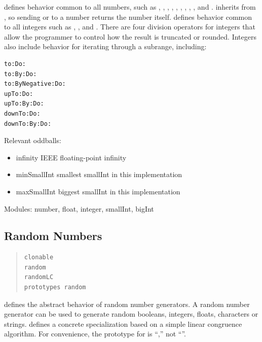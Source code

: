 \documentclass[letterpaper,10pt,english]{sphinxmanual}
\begin{document}
 defines behavior common to all numbers, such as , , ,
, , , , , , and . 
inherits from , so sending  or  to a number returns the
number itself.  defines behavior common to all integers such as , , and
. There are four division operators for integers that allow the programmer to control
how the result is truncated or rounded. Integers also include behavior for iterating through a subrange,
including:

\begin{Verbatim}[commandchars=\\\{\}]
to:Do:
to:By:Do:
to:ByNegative:Do:
upTo:Do:
upTo:By:Do:
downTo:Do:
downTo:By:Do:
\end{Verbatim}

Relevant oddballs:
\begin{itemize}
\item {} 
infinity IEEE floating-point infinity

\item {} 
minSmallInt smallest smallInt in this implementation

\item {} 
maxSmallInt biggest smallInt in this implementation

\end{itemize}

Modules: number, float, integer, smallInt, bigInt


\subsection{Random Numbers}
\label{numbers:random-numbers}\begin{quote}

\begin{Verbatim}[commandchars=\\\{\}]
clonable
random
randomLC
prototypes random
\end{Verbatim}
\end{quote}

 defines the abstract behavior of random number generators. A random number
generator can be used to generate random booleans, integers, floats, characters or strings.  defines a concrete specialization based on a simple linear congruence algorithm. For
convenience, the prototype for  is “,” not “”.
\end{document}
